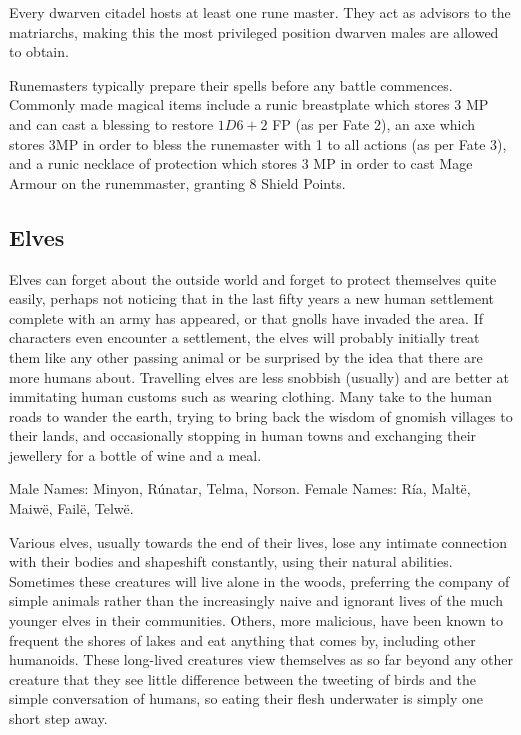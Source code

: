 \begin{multicols}{2}
\label{dwarven_runemaster}

Every dwarven citadel hosts at least one rune master.  They act as advisors to the matriarchs, making this the most privileged position dwarven males are allowed to obtain.

\dwarvenrunemaster

	Runemasters typically prepare their spells before any battle commences. Commonly made magical items include a runic breastplate which stores 3 MP and can cast  a blessing to restore $1D6+2$ FP (as per Fate 2), an axe which stores 3MP in order to bless the runemaster with 1 to all actions (as per Fate 3), and a runic necklace of protection which stores 3 MP in order to cast Mage Armour on the runemmaster, granting 8 Shield Points.

\subsection{Elves}

Elves can forget about the outside world and forget to protect themselves quite easily, perhaps not noticing that in the last fifty years a new human settlement complete with an army has appeared, or that gnolls have invaded the area.  If characters even encounter a settlement, the elves will probably initially treat them like any other passing animal or be surprised by the idea that there are more humans about.  Travelling elves are less snobbish (usually) and are better at immitating human customs such as wearing clothing.  Many take to the human roads to wander the earth, trying to bring back the wisdom of gnomish villages to their lands, and occasionally stopping in human towns and exchanging their jewellery for a bottle of wine and a meal.

Male Names: Minyon, R\'{u}natar, Telma, Norson.  Female Names: R\'{i}a, Malt\"{e}, Maiw\"{e}, Fail\"{e}, Telw\"{e}.

\label{dryad}
\dryad

Various elves, usually towards the end of their lives, lose any intimate connection with their bodies and shapeshift constantly, using their natural abilities.  Sometimes these creatures will live alone in the woods, preferring the company of simple animals rather than the increasingly naive and ignorant lives of the much younger elves in their communities.  Others, more malicious, have been known to frequent the shores of lakes and eat anything that comes by, including other humanoids.  These long-lived creatures view themselves as so far beyond any other creature that they see little difference between the tweeting of birds and the simple conversation of humans, so eating their flesh underwater is simply one short step away.


\end{multicols}
